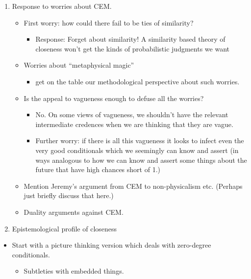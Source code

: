 \documentclass[leqno, 11pt, a5paper, openany]{article}
\begin{document}
\begin{enumerate}
\item
  Response to worries about CEM.

  \begin{itemize}
    \item
    First worry: how could there fail to be ties of similarity?

    \begin{itemize}
        \item
      Response: Forget about similarity! A similarity based theory of
      closeness won't get the kinds of probabilistic judgments we want
    \end{itemize}
  \item
    Worries about “metaphysical magic”

    \begin{itemize}
        \item
      get on the table our methodological perspective about such
      worries.
    \end{itemize}
  \item
    Is the appeal to vagueness enough to defuse all the worries?

    \begin{itemize}
        \item
      No. On some views of vagueness, we shouldn't have the relevant
      intermediate credences when we are thinking that they are vague.\\
    \item
      Further worry: if there is all this vagueness it looks to infect
      even the very good conditionals which we seemingly can know and
      assert (in ways analogous to how we can know and assert some
      things about the future that have high chances short of 1.)
    \end{itemize}
  \item
    Mention Jeremy's argument from CEM to non-physicalism etc. (Perhaps
    just briefly discuss that here.)
  \item
    Duality arguments against CEM.
  \end{itemize}
\item
  Epistemological profile of closeness
\end{enumerate}

\begin{itemize}
\item
  Start with a picture thinking version which deals with zero-degree
  conditionals.

  \begin{itemize}
    \item
    Subtleties with embedded things.
  \end{itemize}
\end{itemize}
\end{document}
